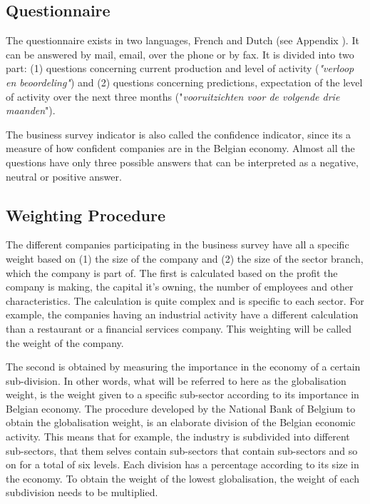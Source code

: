 \documentclass[12pt,a4paper,oneside]{book}
\begin{document}
\subsection{Questionnaire}
\label{sec:Questionnaire}

The questionnaire exists in two languages, French and Dutch (see Appendix ). It can be answered by mail, email, over the phone or by fax.
It is divided into two part:
(1) questions concerning current production and level of activity (\textit{"verloop en beoordeling"}) and
(2) questions concerning predictions, expectation of the level of activity over the next three months ("\textit{vooruitzichten voor de volgende drie maanden}").

The business survey indicator is also called the confidence indicator, since its a measure of how confident companies are in the Belgian economy.
Almost all the questions have only three possible answers that can be interpreted as a negative, neutral or positive answer.

\subsection{Weighting Procedure}
\label{sec:Weighting procedure}

The different companies participating in the business survey have all a specific weight based on (1) the size of the company and (2) the size of the sector branch, which the company is part of.
The first is calculated based on the profit the company is making, the capital it's owning, the number of employees and other characteristics. 
The calculation is quite complex and is specific to each sector. 
For example, the companies having an industrial activity have a different calculation than a restaurant or a financial services company. This weighting will be called the weight of the company.

The second is obtained by measuring the importance in the economy of a certain sub-division. In other words, what will be referred to here as the globalisation weight, is the weight given to a specific sub-sector according to its importance in Belgian economy.
The procedure developed by the National Bank of Belgium to obtain the globalisation weight, is an elaborate division of the Belgian economic activity. This means that for example, the industry is subdivided into different sub-sectors, that them selves contain sub-sectors that contain sub-sectors and so on for a total of six levels. 
Each division has a percentage according to its size in the economy.
To obtain the weight of the lowest globalisation, the weight of each subdivision needs to be multiplied. 
\end{document}
